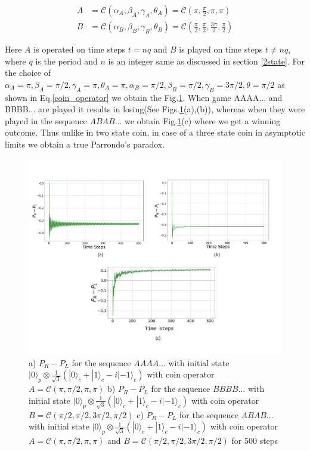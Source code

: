 \documentclass[english,aps,pra,amsmath,amssymb,showpacs,notitlepage,onecolumn]{revtex4-1}
\begin{document}
\begin{equation}\label{coin_operator}
\begin{array}{ll}
A &= \mathcal{C}(\alpha_A, \beta_A, \gamma_A, \theta_A) = \mathcal{C}(\pi, \frac{\pi}{2}, \pi, \pi) \\
B &= \mathcal{C}(\alpha_B, \beta_B, \gamma_B, \theta_B) = \mathcal{C}(\frac{\pi}{2}, \frac{\pi}{2}, \frac{3\pi}{2}, \frac{\pi}{2})
\end{array}
\end{equation}

Here $A$ is operated on time steps
$t=nq$ and $B$ is played on time steps $t\neq nq$, where $q$ is the period and $n$ is an integer same as discussed in section \ref{2state}. For the choice of $\alpha_A=\pi,\beta_{A}=\pi/2,\gamma_{A}=\pi,\theta_{A}=\pi, \alpha_{B}=\pi/2,\beta_{B}=\pi/2,\gamma_B=3\pi/2, \theta=\pi/2$ as shown in Eq.\ref{coin_operator} we obtain the Fig.\ref{result}. When game AAAA... and BBBB... are played it results in losing(See Figs.\ref{result}(a),(b)), whereas when they were played in the sequence $ABAB\ldots$ we obtain Fig.\ref{result}(c) where we get a winning outcome. Thus unlike in two state coin, in case of a three state coin in asymptotic limits we obtain a true Parrondo's paradox.
\begin{figure}[H]
\includegraphics[scale=0.6]{3state_plot.pdf}
 \caption{a) $P_R -P_L$ for the sequence $AAAA\ldots$ with initial state $| 0 \rangle_p \otimes \frac{1}{\sqrt{3}}(| 0 \rangle_c + | 1 \rangle_c - i| -1 \rangle_c)$ with coin operator $A = \mathcal{C}(\pi, \pi/2, \pi, \pi)$  b) $P_R -P_L$ for the sequence $BBBB\ldots$ with initial state $| 0 \rangle_p \otimes \frac{1}{\sqrt{3}}(| 0 \rangle_c + | 1 \rangle_c - i| -1 \rangle_c)$ with coin operator $B = \mathcal{C}(\pi/2, \pi/2, 3\pi/2, \pi/2)$ c) $P_R -P_L$ for the sequence $ABAB\ldots$ with initial state $| 0 \rangle_p \otimes \frac{1}{\sqrt{3}}(| 0 \rangle_c + | 1 \rangle_c - i| -1 \rangle_c)$ with coin operator $A = \mathcal{C}(\pi, \pi/2, \pi, \pi)$ and $B = \mathcal{C}(\pi/2, \pi/2, 3\pi/2, \pi/2)$ for 500 steps}\label{result}
\end{figure}
\end{document}
